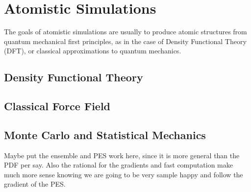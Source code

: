 \section{Atomistic Simulations}
The goals of atomistic simulations are usually to produce atomic structures from quantum mechanical first principles, as in the case of Density Functional Theory (DFT), or classical approximations to quantum mechanics.
\subsection{Density Functional Theory}
\subsection{Classical Force Field}
\subsection{Monte Carlo and Statistical Mechanics}

Maybe put the ensemble and PES work here, since it is more general than the PDF per say. Also the rational for the gradients and fast computation make much more sense knowing we are going to be very sample happy and follow the gradient of the PES.